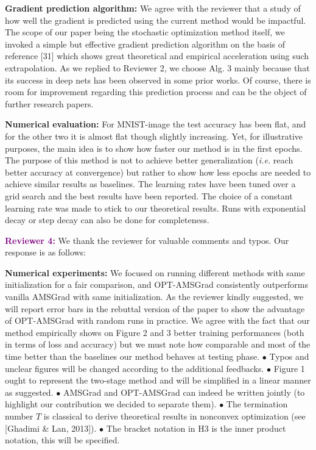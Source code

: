 \documentclass{article}
\begin{document}
\textbf{Gradient prediction algorithm:}
We agree with the reviewer that a study of how well the gradient is predicted using the current method would be impactful.
The scope of our paper being the stochastic optimization method itself, we invoked a simple but effective gradient prediction algorithm on the basis of reference [31] which shows great theoretical and empirical acceleration using such extrapolation. 
As we replied to Reviewer 2, we choose Alg. 3 mainly because that its success in deep nets has been observed in some prior works.
Of course, there is room for improvement regarding this prediction process and can be the object of further research papers.\vspace{-5pt}


\textbf{Numerical evaluation:}  For MNIST-image the test accuracy has been flat, and for the other two it is almost flat though slightly increasing.
Yet, for illustrative purposes, the main idea is to show how faster our method is in the first epochs.
The purpose of this method is not to achieve better generalization (\textit{i.e.} reach better accuracy at convergence) but rather to show how less epochs are needed to achieve similar results as baselines.
The learning rates have been tuned over a grid search and the best results have been reported. The choice of a constant learning rate was made to stick to our theoretical results.
Runs with exponential decay or step decay can also be done for completeness.\vspace{-5pt}


\textbf{\textcolor{purple}{Reviewer 4:}} We thank the reviewer for valuable comments and typos. Our response is as follows:\vspace{-5pt}

\textbf{Numerical experiments:}
We focused on running different methods with same initialization for a fair comparison, and OPT-AMSGrad consistently outperforms vanilla AMSGrad with same initialization. As the reviewer kindly suggested, we will report error bars in the rebuttal version of the paper to show the advantage of OPT-AMSGrad with random runs in practice.
We agree with the fact that our method empirically shows on Figure 2 and 3 better training performances (both in terms of loss and accuracy) but we must note how comparable and most of the time better than the baselines our method behaves at testing phase.
$\bullet$ Typos and unclear figures will be changed according to the additional feedbacks.
$\bullet$ Figure 1 ought to represent the two-stage method and will be simplified in a linear manner as suggested. $\bullet$ AMSGrad and OPT-AMSGrad can indeed be written jointly (to highlight our contribution we decided to separate them). $\bullet$ The termination number $T$ is classical to derive theoretical results in nonconvex optimization (see [Ghadimi \& Lan, 2013]). $\bullet$ The bracket notation in H3 is the inner product notation, this will be specified.
\end{document}
